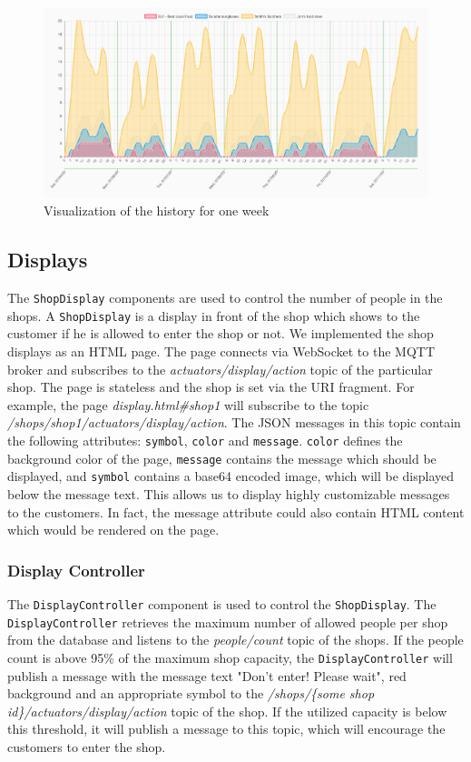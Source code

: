 \documentclass[runningheads]{llncs}
\newcommand{\attribute}[1]{\texttt{#1}}
\newcommand{\topicname}[1]{\textit{#1}}
\newcommand{\componentname}[1]{\texttt{#1}}
\begin{document}
\begin{figure}
    \centering
    \includegraphics[width=1\textwidth]{assets/frontend/history.pdf}
    \caption{Visualization of the history for one week}
    \label{fig:history}
\end{figure}


\subsection{Displays}\label{sec:displays}
The \componentname{ShopDisplay} components are used to control the number of people in the shops. A \componentname{ShopDisplay} is a display in front of the shop which shows to the customer if he is allowed to enter the shop or not. We implemented the shop displays as an HTML page. The page connects via WebSocket to the MQTT broker and subscribes to the \topicname{actuators/display/action} topic of the particular shop. The page is stateless and the shop is set via the URI fragment. For example, the page \topicname{display.html\#shop1} will subscribe to the topic \topicname{/shops/shop1/actuators\allowbreak/display/action}. The JSON messages in this topic contain the following attributes: \attribute{symbol}, \attribute{color} and \attribute{message}. \attribute{color} defines the background color of the page, \attribute{message} contains the message which should be displayed, and \attribute{symbol} contains a base64 encoded image, which will be displayed below the message text. This allows us to display highly customizable messages to the customers. In fact, the message attribute could also contain HTML content which would be rendered on the page.

\subsubsection{Display Controller}\label{sec:display-control}
The \componentname{DisplayController} component is used to control the \componentname{ShopDisplay}. The \componentname{DisplayController} retrieves the maximum number of allowed people per shop from the database and listens to the \topicname{people/count} topic of the shops. If the people count is above 95\% of the maximum shop capacity, the \componentname{DisplayController} will publish a message with the message text "Don't enter! Please wait", red background and an appropriate symbol to the \topicname{/shops/\{some shop id\}/actuators\allowbreak/display/action} topic of the shop. If the utilized capacity is below this threshold, it will publish a message to this topic, which will encourage the customers to enter the shop.
\end{document}
